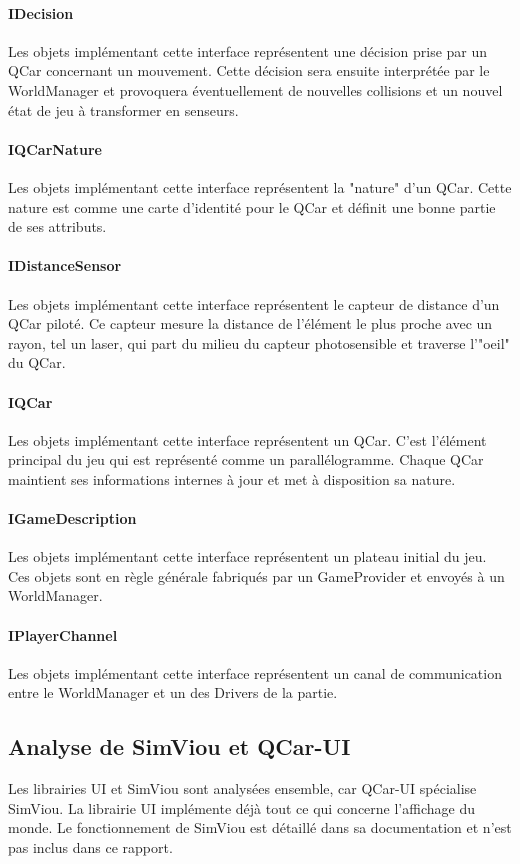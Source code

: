 \documentclass[a4paper, 12pt]{article}
\begin{document}
\paragraph{IDecision}
Les objets implémentant cette interface représentent une décision prise par un QCar concernant un mouvement. Cette décision sera ensuite interprétée par le WorldManager et provoquera éventuellement de nouvelles collisions et un nouvel état de jeu à transformer en senseurs.
\paragraph{IQCarNature}
Les objets implémentant cette interface représentent la "nature" d'un QCar. Cette nature est comme une carte d'identité pour le QCar et définit une bonne partie de ses attributs.
\paragraph{IDistanceSensor}
Les objets implémentant cette interface représentent le capteur de distance d'un QCar piloté. Ce capteur mesure la distance de l'élément le plus proche avec un rayon, tel un laser, qui part du milieu du capteur photosensible et traverse l'"oeil" du QCar.
\paragraph{IQCar}
Les objets implémentant cette interface représentent un QCar. C'est l'élément principal du jeu qui est représenté comme un parallélogramme. Chaque QCar maintient ses informations internes à jour et met à disposition sa nature.
\paragraph{IGameDescription}
Les objets implémentant cette interface représentent un plateau initial du jeu. Ces objets sont en règle générale fabriqués par un GameProvider et envoyés à un WorldManager.
\paragraph{IPlayerChannel}
Les objets implémentant cette interface représentent un canal de communication entre le WorldManager et un des Drivers de la partie.
\subsection{Analyse de SimViou et QCar-UI}
Les librairies UI et SimViou sont analysées ensemble, car QCar-UI spécialise SimViou. La librairie UI implémente déjà tout ce qui concerne l'affichage du monde. Le fonctionnement de SimViou est détaillé dans sa documentation et n'est pas inclus dans ce rapport. 
\end{document}
